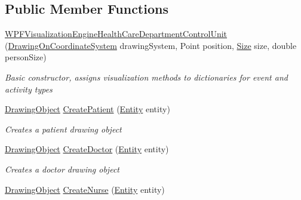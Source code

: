 \subsection*{Public Member Functions}
\begin{DoxyCompactItemize}
\item 
\hyperlink{class_sample_hospital_model_1_1_visualization_1_1_w_p_f_visualization_engine_health_care_department_control_unit_a897a51338edd7243dcf4dfda927be6b6}{W\+P\+F\+Visualization\+Engine\+Health\+Care\+Department\+Control\+Unit} (\hyperlink{class_w_p_f_visualization_base_1_1_drawing_on_coordinate_system}{Drawing\+On\+Coordinate\+System} drawing\+System, Point position, \hyperlink{class_sample_hospital_model_1_1_visualization_1_1_w_p_f_visualization_engine_health_care_department_control_unit_abe4ba0d78d527ff6c4cdde7dd27943fc}{Size} size, double person\+Size)
\begin{DoxyCompactList}\small\item\em Basic constructor, assigns visualization methods to dictionaries for event and activity types \end{DoxyCompactList}\item 
\hyperlink{class_w_p_f_visualization_base_1_1_drawing_object}{Drawing\+Object} \hyperlink{class_sample_hospital_model_1_1_visualization_1_1_w_p_f_visualization_engine_health_care_department_control_unit_a3571407fd3c83321bab8ccdae3baac0e}{Create\+Patient} (\hyperlink{class_simulation_core_1_1_h_c_c_m_elements_1_1_entity}{Entity} entity)
\begin{DoxyCompactList}\small\item\em Creates a patient drawing object \end{DoxyCompactList}\item 
\hyperlink{class_w_p_f_visualization_base_1_1_drawing_object}{Drawing\+Object} \hyperlink{class_sample_hospital_model_1_1_visualization_1_1_w_p_f_visualization_engine_health_care_department_control_unit_ab39da1d23eebe1d8fe34c03b137e877f}{Create\+Doctor} (\hyperlink{class_simulation_core_1_1_h_c_c_m_elements_1_1_entity}{Entity} entity)
\begin{DoxyCompactList}\small\item\em Creates a doctor drawing object \end{DoxyCompactList}\item 
\hyperlink{class_w_p_f_visualization_base_1_1_drawing_object}{Drawing\+Object} \hyperlink{class_sample_hospital_model_1_1_visualization_1_1_w_p_f_visualization_engine_health_care_department_control_unit_a650fbd7d7bb218e7e719a4dcac3d4a3f}{Create\+Nurse} (\hyperlink{class_simulation_core_1_1_h_c_c_m_elements_1_1_entity}{Entity} entity)

\end{DoxyCompactItemize}
